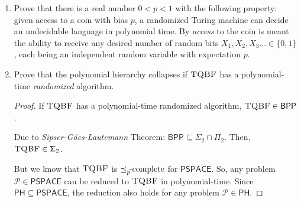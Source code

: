 \documentclass[usletter]{article}
\newcommand {\langset}[1]      {\ensuremath{\mathcal{#1}}}
\newcommand {\machine}[1]      {\ensuremath{\mathscr{#1}}}
\newcommand {\namedlangset}[1] {\ensuremath{\textnormal{\textsc{#1}}}}
\newcommand {\family}[1]       {\ensuremath{\mathsf{#1}}}
\newcommand {\term}[1]      {\textit{#1}}
\newcommand {\namethm}[1]   {\term{#1} Theorem}
\newcommand {\reduce}[2]    {\ensuremath{\preceq_{#1}^{#2}}}
\newcommand {\complete}[2]  {\ensuremath{\reduce{#1}{#2}     %
                                         \hspace*{-4pt}\textnormal{-complete}}}
\newcommand {\PH}     {\family{PH}}
\newcommand {\NP}     {\family{NP}}
\newcommand {\RP}     {\family{RP}}
\newcommand {\BPP}    {\family{BPP}}
\newcommand {\PSPACE} {\family{PSPACE}}
\newcommand {\FPi}    {\family{\Pi}}
\newcommand {\FSigma} {\family{\Sigma}}
\begin{document}
\begin{enumerate}[labelsep=2.5em, label=\textbf{\arabic{enumi}}]
\begin{proof}
    As \machine{R} now has a false-negative rate $\leq \frac{n}{e^{k/2}} \leq
    \frac{n}{3n} = \frac{1}{3}$; it establishes that
    $\namedlangset{SAT} \in \RP$; starting with the assumption that
    $\namedlangset{SAT} \in \BPP$. \\
    And since $\namedlangset{SAT} \in \RP$, we would have the same for any
    \NP-complete problem.
  \end{proof}
  \begin{remark}
    The above proof implies : $\NP \subseteq \RP$. But in fact $\NP = \RP$! \\
    This is because $\RP \subseteq \NP$, as discussed in class -- a problem
    being in \RP, shows that it has at least \textit{exponentially} many
    certificates; which is a subset of problems with at least \textit{one}
    certificate (\NP).
  \end{remark}


  \item Prove that there is a real number $0 < p < 1$ with the following
        property: given access to a coin with bias $p$, a randomized Turing
        machine can decide an undecidable language in polynomial time. By
        \textit{access} to the coin is meant the ability to receive any desired
        number of random bits $X_1, X_2, X_3 ... \in \{0,1\}$, each being an
        independent random variable with expectation $p$.


  \item Prove that the polynomial hierarchy collapses if \namedlangset{TQBF} has
        a polynomial-time \textit{randomized} algorithm.
  \begin{proof}
    If \namedlangset{TQBF} has a polynomial-time randomized algorithm,
    $\namedlangset{TQBF} \in \BPP$.

    Due to \namethm{Sipser-G\'{a}cs-Lautemann}\cite{Lautemann1983}:
    $\BPP \subseteq \FSigma_2 \cap \FPi_2$.
    Then, $\namedlangset{TQBF} \in \FSigma_2$.

    But we know that \namedlangset{TQBF} is \complete{p}{} for \PSPACE. So, any
    problem $\langset{P} \in \PSPACE$ can be reduced to \namedlangset{TQBF} in
    polynomial-time. Since $\PH \subseteq \PSPACE$, the reduction also holds for
    any problem $\langset{P} \in \PH$.


\end{proof}
\end{enumerate}
\end{document}

